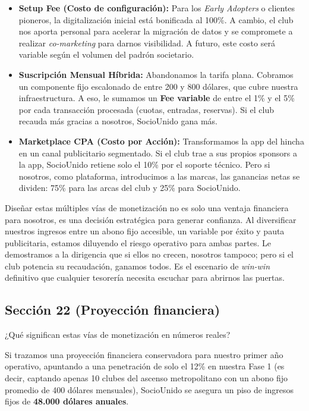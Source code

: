 \begin{itemize}
    \item \textbf{Setup Fee (Costo de configuración):} Para los \textit{Early Adopters} o clientes pioneros, la digitalización inicial está bonificada al 100\%. A cambio, el club nos aporta personal para acelerar la migración de datos y se compromete a realizar \textit{co-marketing} para darnos visibilidad. A futuro, este costo será variable según el volumen del padrón societario.
    \item \textbf{Suscripción Mensual Híbrida:} Abandonamos la tarifa plana. Cobramos un componente fijo escalonado de entre 200 y 800 dólares, que cubre nuestra infraestructura. A eso, le sumamos un \textbf{Fee variable} de entre el 1\% y el 5\% por cada transacción procesada (cuotas, entradas, reservas). Si el club recauda más gracias a nosotros, SocioUnido gana más. 
    \item \textbf{Marketplace CPA (Costo por Acción):} Transformamos la app del hincha en un canal publicitario segmentado. Si el club trae a sus propios sponsors a la app, SocioUnido retiene solo el 10\% por el soporte técnico. Pero si nosotros, como plataforma, introducimos a las marcas, las ganancias netas se dividen: 75\% para las arcas del club y 25\% para SocioUnido.
\end{itemize}

Diseñar estas múltiples vías de monetización no es solo una ventaja financiera para nosotros, es una decisión estratégica para generar confianza. Al diversificar nuestros ingresos entre un abono fijo accesible, un variable por éxito y pauta publicitaria, estamos diluyendo el riesgo operativo para ambas partes. Le demostramos a la dirigencia que si ellos no crecen, nosotros tampoco; pero si el club potencia su recaudación, ganamos todos. Es el escenario de \textit{win-win} definitivo que cualquier tesorería necesita escuchar para abrirnos las puertas.

\subsection{Sección 22 (Proyección financiera)}

¿Qué significan estas vías de monetización en números reales? 

Si trazamos una proyección financiera conservadora para nuestro primer año operativo, apuntando a una penetración de solo el 12\% en nuestra Fase 1 (es decir, captando apenas 10 clubes del ascenso metropolitano con un abono fijo promedio de 400 dólares mensuales), SocioUnido se asegura un piso de ingresos fijos de \textbf{48.000 dólares anuales}. 

